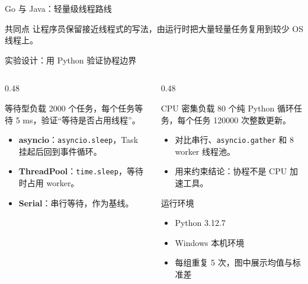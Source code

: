 \documentclass[UTF8,aspectratio=169,11pt]{ctexbeamer}
\begin{document}
\begin{frame}{Go 与 Java：轻量级线程路线}
  \vspace{0.5em}
  \begin{block}{共同点}
    让程序员保留接近线程式的写法，由运行时把大量轻量任务复用到较少 OS 线程上。
  \end{block}
\end{frame}

\begin{frame}{实验设计：用 Python 验证协程边界}
  \begin{columns}[T,onlytextwidth]
    \begin{column}{0.48\textwidth}
      \begin{block}{等待型负载}
        2000 个任务，每个任务等待 5 ms，验证“等待是否占用线程”。
      \end{block}
      \begin{itemize}
        \item \textbf{asyncio}：\texttt{asyncio.sleep}，Task 挂起后回到事件循环。
        \item \textbf{ThreadPool}：\texttt{time.sleep}，等待时占用 worker。
        \item \textbf{Serial}：串行等待，作为基线。
      \end{itemize}
    \end{column}
    \begin{column}{0.48\textwidth}
      \begin{block}{CPU 密集负载}
        80 个纯 Python 循环任务，每个任务 120000 次整数更新。
      \end{block}
      \begin{itemize}
        \item 对比串行、\texttt{asyncio.gather} 和 8 worker 线程池。
        \item 用来约束结论：协程不是 CPU 加速工具。
      \end{itemize}
      \vspace{0.3em}
      \begin{block}{运行环境}
        \begin{itemize}
          \item Python 3.12.7
          \item Windows 本机环境
          \item 每组重复 5 次，图中展示均值与标准差
        \end{itemize}
      \end{block}
    \end{column}
  \end{columns}
\end{frame}
\end{document}
